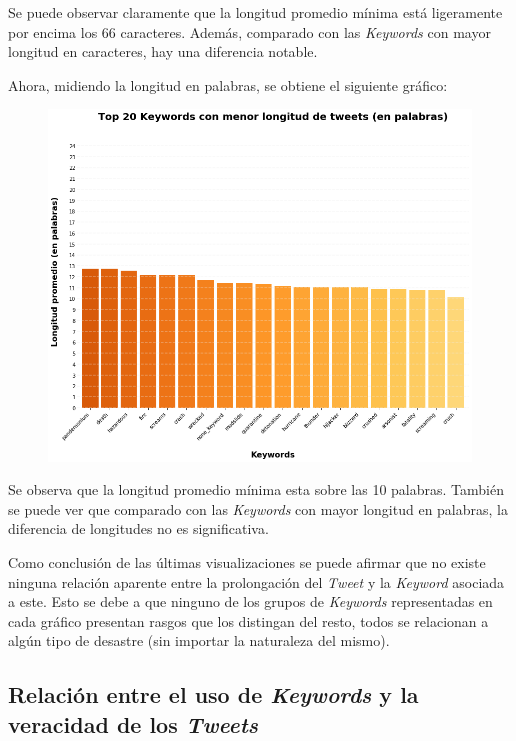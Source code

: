 \documentclass[titlepage,a4paper]{article}
\begin{document}
    Se puede observar claramente que la longitud promedio mínima está ligeramente por encima los 66 caracteres. Además, comparado con las \textit{Keywords} con mayor longitud en caracteres, hay una diferencia notable. 
    
    Ahora, midiendo la longitud en palabras, se obtiene el siguiente gráfico:
    \begin{figure}[H]
    \centering
    \includegraphics[width=1\textwidth]{graficos/Analisis de Keyword/top_20_keywords_con_menor_long_de_tweets.png}
    \caption{} 
    \end{figure}
    Se observa que la longitud promedio mínima esta sobre las 10 palabras. También se puede ver que comparado con las \textit{Keywords} con mayor longitud en palabras, la diferencia de longitudes no es significativa. 
    
    Como conclusión de las últimas visualizaciones se puede afirmar que no existe ninguna relación aparente entre la prolongación del \textit{Tweet} y la \textit{Keyword} asociada a este. Esto se debe a que ninguno de los grupos de \textit{Keywords} representadas en cada gráfico presentan rasgos que los distingan del resto, todos se relacionan a algún tipo de desastre (sin importar la naturaleza del mismo).
    
    \subsection{Relación entre el uso de \textit{Keywords} y la veracidad de los \textit{Tweets}}
    
\end{document}
